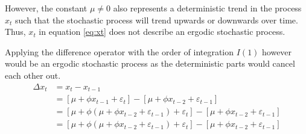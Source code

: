 However, the constant $\mu\neq0$ also represents a deterministic trend in the process $x_t$ such that the stochastic process will trend upwards or downwards over time. Thus, $x_t$ in equation \ref{eq:xt} does not describe an ergodic stochastic process.

Applying the difference operator with the order of integration $I(1)$ however would be an ergodic stochastic process as the deterministic parts would cancel each other out.
\begin{equation}
  \begin{split}
    \Delta x_t  &= x_{t} - x_{t-1}\\
                &= [\mu + \phi x_{t-1} +\varepsilon_t] - [\mu + \phi x_{t-2} +\varepsilon_{t-1}]\\
                &= [\mu + \phi (\mu + \phi x_{t-2}+\varepsilon_{t-1}) +\varepsilon_t] - [\mu + \phi x_{t-2} +\varepsilon_{t-1}]\\
                &= [\mu + \phi (\mu + \phi x_{t-2}+\varepsilon_{t-1}) +\varepsilon_t] - [\mu + \phi x_{t-2} +\varepsilon_{t-1}]
        \label{eq:difference}
  \end{split}
\end{equation}
